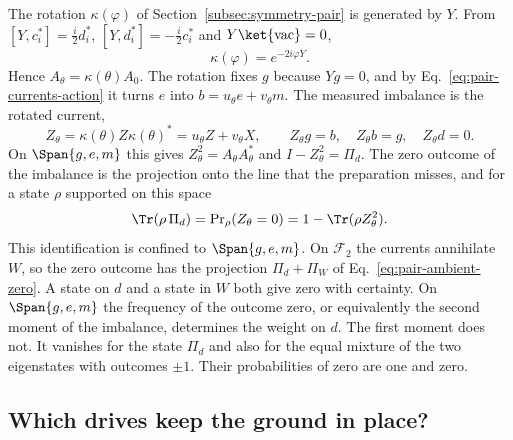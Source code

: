 The rotation $\kappa(\varphi)$ of Section~\ref{subsec:symmetry-pair} is generated by $Y$. From $[Y,c_i^*]=\tfrac i2d_i^*$, $[Y,d_i^*]=-\tfrac i2c_i^*$ and $Y\ket{\mathrm{vac}}=0$,
\begin{equation}
 \kappa(\varphi)=e^{-2i\varphi Y}.
 \label{eq:pair-currents-rotation}
\end{equation}
Hence $A_\theta=\kappa(\theta)A_0$. The rotation fixes $g$ because $Yg=0$, and by Eq.~\eqref{eq:pair-currents-action} it turns $e$ into $b=u_\theta e+v_\theta m$. The measured imbalance is the rotated current,
\begin{equation}
 Z_\theta=\kappa(\theta)Z\kappa(\theta)^*=u_\theta Z+v_\theta X,\qquad
 Z_\theta g=b,\quad Z_\theta b=g,\quad Z_\theta d=0 .
 \label{eq:pair-currents-readout}
\end{equation}
On $\Span\{g,e,m\}$ this gives $Z_\theta^2=A_\theta A_\theta^*$ and $I-Z_\theta^2=\Pi_d$. The zero outcome of the imbalance is the projection onto the line that the preparation misses, and for a state $\rho$ supported on this space
\begin{equation}
 \Tr(\rho\,\Pi_d)=\Pr\nolimits_\rho(Z_\theta=0)=1-\Tr(\rho Z_\theta^2).
 \label{eq:pair-currents-zero}
\end{equation}
This identification is confined to $\Span\{g,e,m\}$. On $\mathcal F_2$ the currents annihilate $W$, so the zero outcome has the projection $\Pi_d+\Pi_W$ of Eq.~\eqref{eq:pair-ambient-zero}. A state on $d$ and a state in $W$ both give zero with certainty. On $\Span\{g,e,m\}$ the frequency of the outcome zero, or equivalently the second moment of the imbalance, determines the weight on $d$. The first moment does not. It vanishes for the state $\Pi_d$ and also for the equal mixture of the two eigenstates with outcomes $\pm1$. Their probabilities of zero are one and zero.

\subsection{Which drives keep the ground in place?}
\label{subsec:pair-currents-drives}


